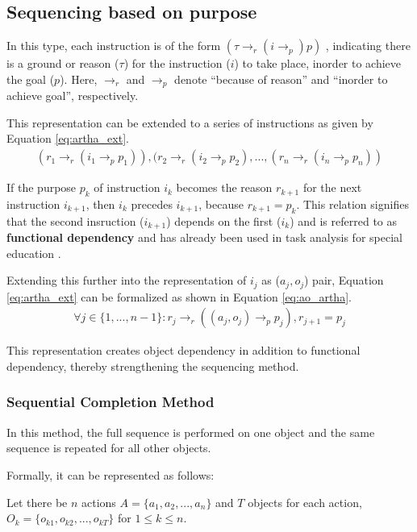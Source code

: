 \documentclass[a4paper,11pt]{lmcs}
\begin{document}
\subsection{Sequencing based on purpose}
\label{sec:artha}
In this type, each instruction is of the form $(\tau \rightarrow_r (i \rightarrow_p) p)$ \cite{llm_mira}, indicating there is a ground or reason ($\tau$) for the instruction ($i$) to take place, inorder to achieve the goal ($p$). Here, $\rightarrow_r$ and $\rightarrow_p$ denote ``because of reason'' and ``inorder to achieve  goal'', respectively.

This representation can be extended to a series of instructions as given by Equation \ref{eq:artha_ext}.
\begin{eqnarray}
 \label{eq:artha_ext}
 (r_1 \rightarrow_r (i_1 \rightarrow_p p_1)), (r_2 \rightarrow_r (i_2 \rightarrow_p p_2), ..., (r_n \rightarrow_r (i_n \rightarrow_p p_n))
\end{eqnarray}

If the purpose $p_k$ of instruction $i_k$ becomes the reason $r_{k+1}$ for the next instruction $i_{k+1}$, then $i_k$ precedes $i_{k+1}$, because $r_{k+1} = p_k$. This relation signifies that the second insruction ($i_{k+1}$) depends on the first ($i_k$) and is referred to as \textbf{functional dependency} and has already been used in task analysis for special education \cite{ta}.

Extending this further into the representation  of $i_j$ as ($a_j,o_j$) pair, Equation \ref{eq:artha_ext} can be formalized as shown in Equation \ref{eq:ao_artha}.
\begin{eqnarray}
 \label{eq:ao_artha}
\forall j \in \{1,...,n-1\}: r_j \rightarrow_r ((a_j,o_j) \rightarrow_p p_j), r_{j+1} = p_j
\end{eqnarray}

This representation creates object dependency in addition to functional dependency, thereby strengthening the sequencing method.

\subsubsection{Sequential Completion Method}
In this method, the full sequence is performed on one object and the same sequence is repeated for all other objects.

Formally, it can be represented as follows:

Let there be $n$ actions $A = \{a_1,a_2,...,a_n\}$ and $T$ objects for each action, $O_k = \{o_{k1},o_{k2},...,o_{kT}\}$ for $1\leq k \leq n$.
\end{document}
